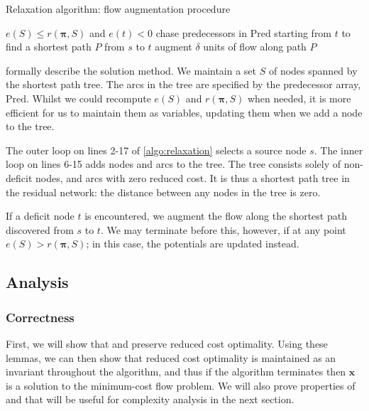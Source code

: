 \begin{algorithm}
    \caption{Relaxation algorithm: flow augmentation procedure}
    \label{algo:relaxation-augment-flow}
    \begin{algorithmic}[1]
        \Require $e(S) \leq r(\boldsymbol{\pi},S)$ and $e(t) < 0$
        \Statex
        \State chase predecessors in $\mathrm{Pred}$ starting from $t$ to find a shortest path $P$ from $s$ to $t$
        \State augment $\delta$ units of flow along path $P$
        \EndFunction
    \end{algorithmic}
\end{algorithm}

 formally describe the solution method. We maintain a set $S$ of nodes spanned by the shortest path tree. The arcs in the tree are specified by the predecessor array, $\mathrm{Pred}$. Whilst we could recompute $e(S)$ and $r(\boldsymbol{\pi},S)$ when needed, it is more efficient for us to maintain them as variables, updating them when we add a node to the tree.

The outer loop on lines 2-17 of \ref{algo:relaxation} selects a source node $s$. The inner loop on lines 6-15 adds nodes and arcs to the tree. The tree consists solely of non-deficit nodes, and arcs with zero reduced cost. It is thus a shortest path tree in the residual network: the distance between any nodes in the tree is zero\footnotemark.

If a deficit node $t$ is encountered, we augment the flow along the shortest path discovered from $s$ to $t$. We may terminate before this, however, if at any point $e(S) > r(\boldsymbol{\pi},S)$; in this case, the potentials are updated instead.

\subsection{Analysis} \label{sec:impl-relax-analysis}

\subsubsection{Correctness}

First, we will show that  and  preserve reduced cost optimality. Using these lemmas, we can then show that reduced cost optimality is maintained as an invariant throughout the algorithm, and thus if the algorithm terminates then $\mathbf{x}$ is a solution to the minimum-cost flow problem. We will also prove properties of  and  that will be useful for complexity analysis in the next section.\\

